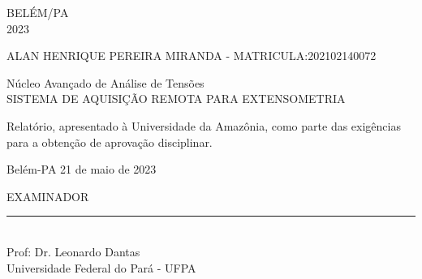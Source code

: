 \onehalfspacing
\begin{center}
	BELÉM/PA\\
	2023
\end{center}

\newpage
\thispagestyle{empty}
\begin{center}
	ALAN HENRIQUE PEREIRA MIRANDA - MATRICULA:202102140072 \\
	\vspace{5cm}

	Núcleo Avançado de Análise de Tensões\\
	SISTEMA DE AQUISIÇÃO REMOTA PARA EXTENSOMETRIA \\
	\vspace{3cm}

\end{center}
\singlespacing
\hspace{8cm} %
\begin{minipage}{7cm}
	\indent Relatório, apresentado à Universidade da Amazônia, como parte das exigências para a obtenção de aprovação disciplinar.\\

	\vspace{2.5cm}

	Belém-PA 21 de maio de 2023 \\
	\vspace{3cm}
\end{minipage}

\onehalfspacing
\begin{center}

	EXAMINADOR\\
	\vspace{2cm}
	\rule{10cm}{0.15mm} \\
	Prof: Dr. Leonardo Dantas \\
	Universidade Federal do Pará - UFPA
\end{center}
